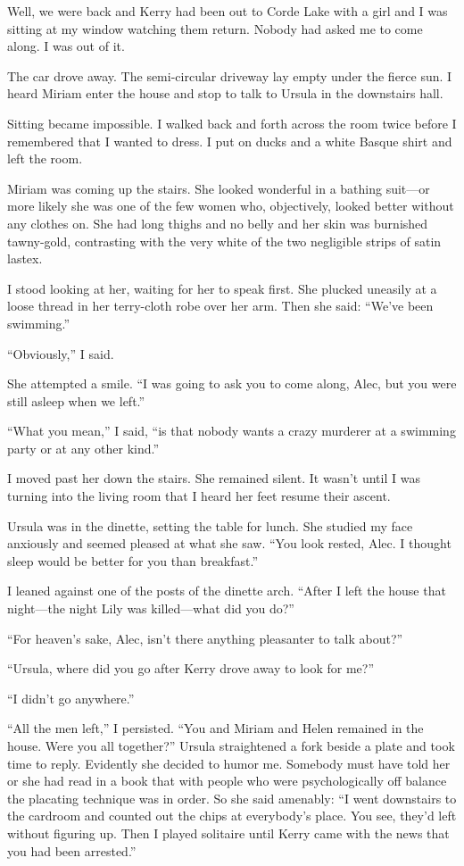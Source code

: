 \documentclass{novel}
\begin{document}
{Well, we were back and Kerry had been out to Corde Lake with a girl and I was sitting at my window watching them return. Nobody had asked me to come along. I was out of it.

The car drove away. The semi-circular driveway lay empty under the fierce sun. I heard Miriam enter the house and stop to talk to Ursula in the downstairs hall.

Sitting became impossible. I walked back and forth across the room twice before I remembered that I wanted to dress. I put on ducks and a white Basque shirt and left the room.

Miriam was coming up the stairs. She looked wonderful in a bathing suit—or more likely she was one of the few women who, objectively, looked better without any clothes on. She had long thighs and no belly and her skin was burnished tawny-gold, contrasting with the very white of the two negligible strips of satin lastex.

I stood looking at her, waiting for her to speak first. She plucked uneasily at a loose thread in her terry-cloth robe over her arm. Then she said: “We’ve been swimming.”

“Obviously,” I said.

She attempted a smile. “I was going to ask you to come along, Alec, but you were still asleep when we left.”

“What you mean,” I said, “is that nobody wants a crazy murderer at a swimming party or at any other kind.”

I moved past her down the stairs. She remained silent. It wasn’t until I was turning into the living room that I heard her feet resume their ascent.

Ursula was in the dinette, setting the table for lunch. She studied my face anxiously and seemed pleased at what she saw. “You look rested, Alec. I thought sleep would be better for you than breakfast.”

I leaned against one of the posts of the dinette arch. “After I left the house that night—the night Lily was killed—what did you do?”

“For heaven’s sake, Alec, isn’t there anything pleasanter to talk about?”

“Ursula, where did you go after Kerry drove away to look for me?”

“I didn’t go anywhere.”

“All the men left,” I persisted. “You and Miriam and Helen remained in the house. Were you all together?” Ursula straightened a fork beside a plate and took time to reply. Evidently she decided to humor me. Somebody must have told her or she had read in a book that with people who were psychologically off balance the placating technique was in order. So she said amenably: “I went downstairs to the cardroom and counted out the chips at everybody’s place. You see, they’d left without figuring up. Then I played solitaire until Kerry came with the news that you had been arrested.”

}
\end{document}
